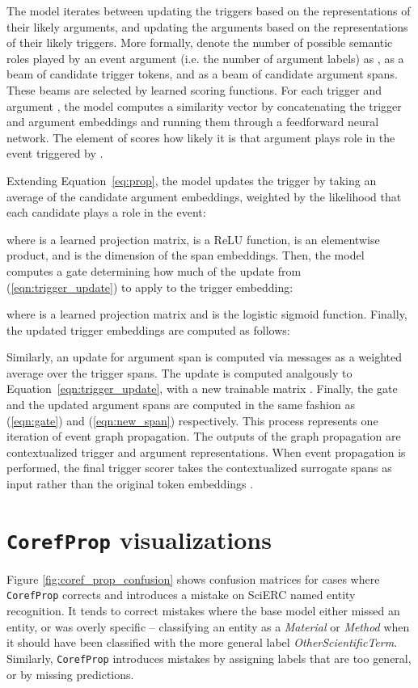 \documentclass[11pt,a4paper]{article}
\begin{document}
The model iterates between updating the triggers based on the representations of their likely arguments, and updating the arguments based on the representations of their likely triggers. More formally, denote the number of possible semantic roles played by an event argument (i.e. the number of argument labels) as ,   as a beam of candidate trigger tokens, and   as a beam of candidate argument spans. These beams are selected by learned scoring functions.
For each trigger  and argument , the model computes a similarity vector  by concatenating the trigger and argument embeddings and running them through a feedforward neural network.
The  element of  scores how likely it is that argument  plays role  in the event triggered by .

Extending Equation~\ref{eq:prop}, the model  updates the trigger  by taking an average of the candidate argument embeddings, weighted by the likelihood that each candidate plays a role in the event:

where  is a learned projection matrix,  is a ReLU function,  is an elementwise product, and  is the dimension of the span embeddings. Then, the model computes a gate determining how much of the update from (\ref{eqn:trigger_update}) to apply to the trigger embedding:

where  is a learned projection matrix and  is the logistic sigmoid function. Finally, the updated trigger embeddings are computed as follows:


Similarly, an update for argument span  is computed via messages  as a weighted average over the trigger spans. The update is computed analgously to Equation~\ref{eqn:trigger_update}, with a new trainable matrix .
Finally, the gate  and the updated argument spans  are computed in the same fashion as (\ref{eqn:gate}) and (\ref{eqn:new_span}) respectively. This process represents one iteration of event graph propagation. The outputs of the graph propagation are contextualized trigger and argument representations. When event propagation is performed, the final trigger scorer takes the contextualized surrogate spans  as input rather than the original token embeddings .

\section{\texttt{CorefProp} visualizations} \label{sec:visualizations}

Figure \ref{fig:coref_prop_confusion} shows confusion matrices for cases where \texttt{CorefProp} corrects and introduces a mistake on SciERC named entity recognition. It tends to correct mistakes where the base model either missed an entity, or was overly specific -- classifying an entity as a \emph{Material} or \emph{Method} when it should have been classified with the more general label \emph{OtherScientificTerm}. Similarly, \texttt{CorefProp} introduces mistakes by assigning labels that are too general, or by missing predictions.
\end{document}
